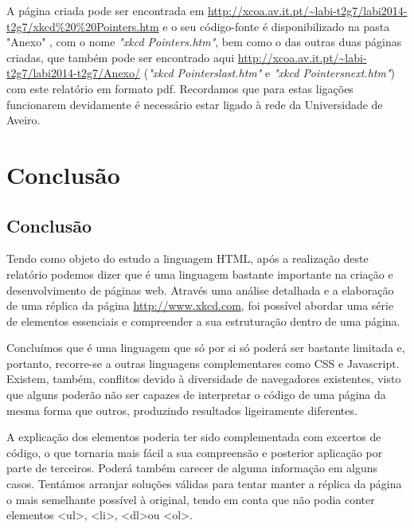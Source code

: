 \documentclass[11pt,openright,twoside]{report}
\begin{document}
A página criada pode ser encontrada em \url{http://xcoa.av.it.pt/~labi-t2g7/labi2014-t2g7/xkcd\%20\%20Pointers.htm} e o seu código-fonte é disponibilizado na pasta "Anexo" , com o nome \textit{"xkcd Pointers.htm"}, bem como o das outras duas páginas criadas, que também pode ser encontrado aqui \url{http://xcoa.av.it.pt/~labi-t2g7/labi2014-t2g7/Anexo/} (\textit{"xkcd Pointerslast.htm"} e \textit{"xkcd Pointersnext.htm"}) com este relatório em formato pdf. Recordamos que para estas ligações funcionarem devidamente é necessário estar ligado à rede da Universidade de Aveiro.

\part{Conclusão}

\chapter{Conclusão}
Tendo como objeto do estudo a linguagem HTML, após a realização deste relatório podemos dizer que é uma linguagem bastante importante na criação e desenvolvimento de páginas web. Através uma análise detalhada e a elaboração de uma réplica da página \url{http://www.xkcd.com}, foi possível abordar uma série de elementos essenciais e compreender a sua estruturação dentro de uma página.
\smallskip

Concluímos que é uma linguagem que só por si só poderá ser bastante limitada e, portanto, recorre-se a outras linguagens complementares como CSS e Javascript. Existem, também, conflitos devido à diversidade de navegadores existentes, visto que alguns poderão não ser capazes de interpretar o código de uma página da mesma forma que outros, produzindo resultados ligeiramente diferentes.
\smallskip

A explicação dos elementos poderia ter sido complementada com excertos de código, o que tornaria mais fácil a sua compreensão e posterior aplicação por parte de terceiros. Poderá também carecer de alguma informação em alguns casos. Tentámos arranjar soluções válidas para tentar manter a réplica da página o mais semelhante possível à original, tendo em conta que não podia conter elementos \textless ul\textgreater, \textless li\textgreater, \textless dl\textgreater ou \textless ol\textgreater.



\end{document}
